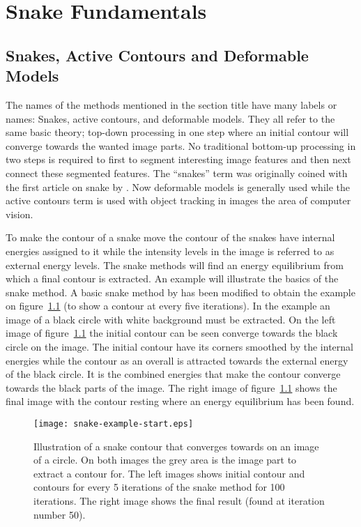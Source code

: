 
\chapter{Snake Fundamentals}
\label{sec:snake-fundamentals}

\section{Snakes, Active Contours and Deformable Models}
\label{sec:snakes-methods}

The names of the methods mentioned in the section title have many
labels or names: Snakes, active contours, and deformable models.  They
all refer to the same basic theory; top-down processing in one step
where an initial contour will converge towards the wanted image parts.
No traditional bottom-up processing in two steps is required to first
to segment interesting image features and then next connect these
segmented features. The ``snakes'' term was originally coined with the
first article on snake by \citet{kass88}. Now deformable models is
generally used while the active contours term is used with object
tracking in images the area of computer vision.

To make the contour of a snake move the contour of the snakes have
internal energies assigned to it while the intensity levels in the
image is referred to as external energy levels. The snake methods will
find an energy equilibrium from which a final contour is extracted. An
example will illustrate the basics of the snake method. A basic snake
method by \citet{xu97a,xu97b} has been modified to obtain the example
on figure~\ref{fig:snake-example-start} (to show a contour at every
five iterations). In the example an image of a black circle with white
background must be extracted. On the left image of
figure~\ref{fig:snake-example-start} the initial contour can be seen
converge towards the black circle on the image. The initial contour
have its corners smoothed by the internal energies while the contour
as an overall is attracted towards the external energy of the black
circle. It is the combined energies that make the contour converge
towards the black parts of the image. The right image of
figure~\ref{fig:snake-example-start} shows the final image with the contour
resting where an energy equilibrium has been found.
\begin{figure}[htbp] \centering
  \texttt{[image: snake-example-start.eps]}
  \caption{Illustration of a snake contour that converges towards on
    an image of a circle. On both images the grey area is the image
    part to extract a contour for. The left images shows initial
    contour and contours for every 5 iterations of the snake method
    for 100 iterations. The right image shows the final result (found at
    iteration number 50).}
  \label{fig:snake-example-start}
\end{figure}

